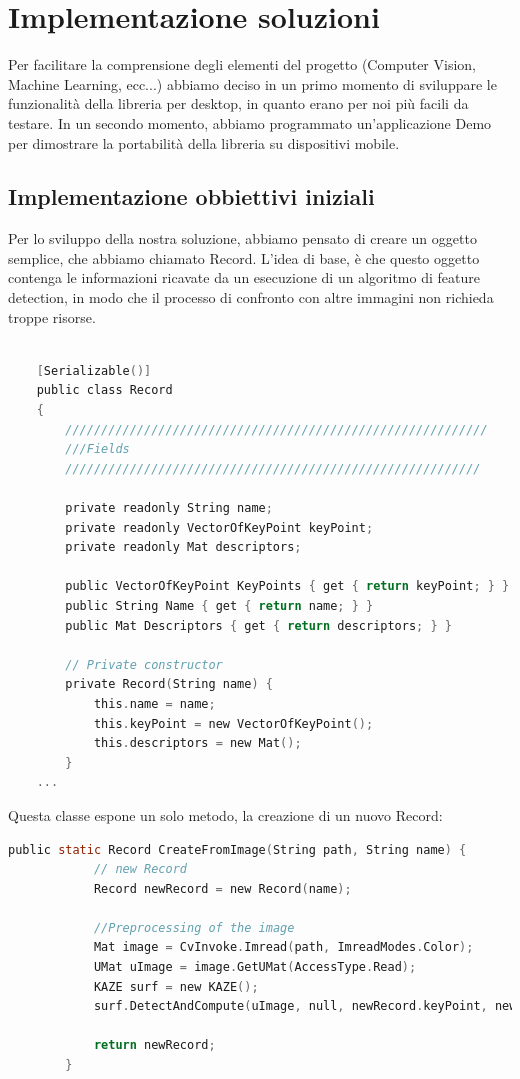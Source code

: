 \documentclass[twoside]{supsistudent}
\begin{document}
\chapter{Implementazione soluzioni}%
Per facilitare la comprensione degli elementi del progetto (Computer Vision, Machine Learning, ecc...) abbiamo deciso in un primo momento di sviluppare le funzionalità della libreria per desktop, in quanto erano per noi più facili da testare. In un secondo momento, abbiamo programmato un'applicazione Demo per dimostrare la portabilità della libreria su dispositivi mobile.

\section{Implementazione obbiettivi iniziali}%
Per lo sviluppo della nostra soluzione, abbiamo pensato di creare un oggetto semplice, che abbiamo chiamato Record. L'idea  di base, è che questo oggetto contenga le informazioni ricavate da un esecuzione di un algoritmo di feature detection, in modo che il processo di confronto con altre immagini non richieda troppe risorse. 

\begin{lstlisting}[language=C]

    [Serializable()]
    public class Record
    {
        ///////////////////////////////////////////////////////////
        ///Fields
        //////////////////////////////////////////////////////////

        private readonly String name;
        private readonly VectorOfKeyPoint keyPoint;
        private readonly Mat descriptors;

        public VectorOfKeyPoint KeyPoints { get { return keyPoint; } }
        public String Name { get { return name; } }
        public Mat Descriptors { get { return descriptors; } }

        // Private constructor
        private Record(String name) {
            this.name = name;
            this.keyPoint = new VectorOfKeyPoint();
            this.descriptors = new Mat();
        }
    ...
\end{lstlisting}

Questa classe espone un solo metodo, la creazione di un nuovo Record:

\begin{lstlisting}[language=C]
public static Record CreateFromImage(String path, String name) {
            // new Record
            Record newRecord = new Record(name);

            //Preprocessing of the image
            Mat image = CvInvoke.Imread(path, ImreadModes.Color);
            UMat uImage = image.GetUMat(AccessType.Read);
            KAZE surf = new KAZE();
            surf.DetectAndCompute(uImage, null, newRecord.keyPoint, newRecord.descriptors, false);

            return newRecord;
        }
\end{lstlisting}
\end{document}
